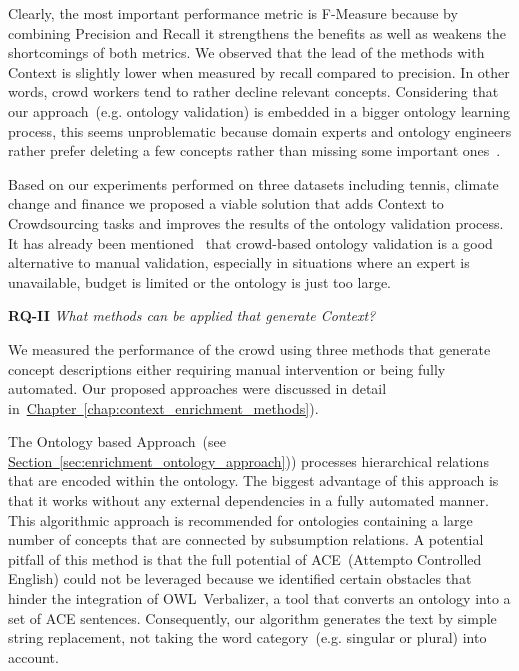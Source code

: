 Clearly, the most important performance metric is F-Measure because by combining Precision and Recall it strengthens the benefits as well as weakens the shortcomings of both metrics. We observed that the lead of the methods with Context is slightly lower when measured by recall compared to precision. In other words, crowd workers tend to rather decline relevant concepts. Considering that our approach~(e.g. ontology validation) is embedded in a bigger ontology learning process, this seems unproblematic because domain experts and ontology engineers rather prefer deleting a few concepts rather than missing some important ones~\cite{sabou2006}. 

Based on our experiments performed on three datasets including tennis, climate change and finance we proposed a viable solution that adds Context to Crowdsourcing tasks and improves the results of the ontology validation process. It has already been mentioned~\cite{mortensen2015, mortensen2016, wohlgenannt2016} that crowd-based ontology validation is a good alternative to manual validation, especially in situations where an expert is unavailable, budget is limited or the ontology is just too large. 

\textbf{RQ-II} \emph{What methods can be applied that generate Context?}

We measured the performance of the crowd using three methods that generate concept descriptions either requiring manual intervention or being fully automated. Our proposed approaches were discussed in detail in~\hyperref[chap:context_enrichment_methods]{Chapter~\ref*{chap:context_enrichment_methods}}). 

The Ontology based Approach~(see \hyperref[sec:enrichment_ontology_approach]{Section~\ref*{sec:enrichment_ontology_approach}})) processes hierarchical relations that are encoded within the ontology. The biggest advantage of this approach is that it works without any external dependencies in a fully automated manner. This algorithmic approach is recommended for ontologies containing a large number of concepts that are connected by subsumption relations. A potential pitfall of this method is that the full potential of ACE~(Attempto Controlled English) could not be leveraged because we identified certain obstacles that hinder the integration of OWL~Verbalizer, a tool that converts an ontology into a set of ACE sentences. Consequently, our algorithm generates the text by simple string replacement, not taking the word category~(e.g. singular or plural) into account. 

